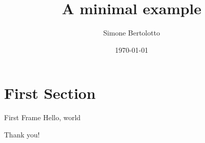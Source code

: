 \documentclass{beamer}
\title{A minimal example}
\date{\today}
\author{Simone Bertolotto}
\institute{Università degli studi di Torino --- Fisica}
\begin{document}
  \maketitle

  \section{First Section}

  \begin{frame}{First Frame}
    Hello, world
  \end{frame}

  \begin{frame}[standout]
    Thank you!
  \end{frame}
\end{document}
